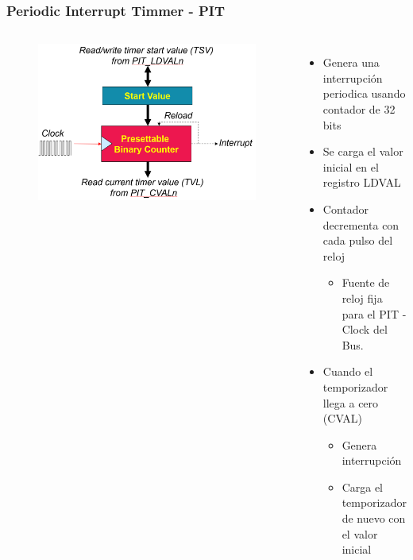 \documentclass[10.5pt,scale=1.0,t,aspectratio=169,hyperref={pdfpagelabels=false}]{beamer}
\begin{document}
\begin{frame}
	\frametitle{Periodic Interrupt Timmer - PIT }
	{\small
		\begin{columns}
			\begin{figure}
				\centering
				\includegraphics[scale=0.3]{02_PIT}
			\end{figure}
		
			\begin{itemize}
				\item Genera una interrupción periodica usando contador de 32 bits
				\item Se carga el valor inicial en el registro LDVAL
				\item Contador decrementa con cada pulso del reloj
				\begin{itemize}
					\item Fuente de reloj fija para el PIT - Clock del Bus. 
				\end{itemize}
				\item Cuando el temporizador llega a cero (CVAL)
				\begin{itemize}
					\item Genera interrupción
					\item Carga el temporizador de nuevo con el valor inicial
				\end{itemize}
			\end{itemize}
		\end{columns}
	}
\end{frame}
\end{document}
